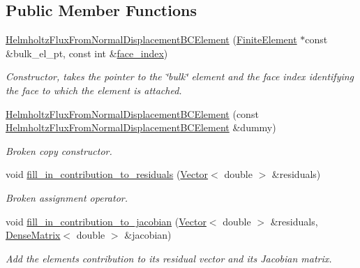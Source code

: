 \subsection*{Public Member Functions}
\begin{DoxyCompactItemize}
\item 
\hyperlink{classoomph_1_1HelmholtzFluxFromNormalDisplacementBCElement_ae37a7a8b5ad9850527f9285f2325aa2c}{Helmholtz\+Flux\+From\+Normal\+Displacement\+B\+C\+Element} (\hyperlink{classoomph_1_1FiniteElement}{Finite\+Element} $\ast$const \&bulk\+\_\+el\+\_\+pt, const int \&\hyperlink{classoomph_1_1FaceElement_a478d577ac6db67ecc80f1f02ae3ab170}{face\+\_\+index})
\begin{DoxyCompactList}\small\item\em Constructor, takes the pointer to the \char`\"{}bulk\char`\"{} element and the face index identifying the face to which the element is attached. \end{DoxyCompactList}\item 
\hyperlink{classoomph_1_1HelmholtzFluxFromNormalDisplacementBCElement_a5c093c485f9df81a14729f2ef41eced1}{Helmholtz\+Flux\+From\+Normal\+Displacement\+B\+C\+Element} (const \hyperlink{classoomph_1_1HelmholtzFluxFromNormalDisplacementBCElement}{Helmholtz\+Flux\+From\+Normal\+Displacement\+B\+C\+Element} \&dummy)
\begin{DoxyCompactList}\small\item\em Broken copy constructor. \end{DoxyCompactList}\item 
void \hyperlink{classoomph_1_1HelmholtzFluxFromNormalDisplacementBCElement_aab5bbb5d7c84d2aa0a5d9112e6f2d914}{fill\+\_\+in\+\_\+contribution\+\_\+to\+\_\+residuals} (\hyperlink{classoomph_1_1Vector}{Vector}$<$ double $>$ \&residuals)
\begin{DoxyCompactList}\small\item\em Broken assignment operator. \end{DoxyCompactList}\item 
void \hyperlink{classoomph_1_1HelmholtzFluxFromNormalDisplacementBCElement_a5e10f6e632c05ce464548f51c8381b43}{fill\+\_\+in\+\_\+contribution\+\_\+to\+\_\+jacobian} (\hyperlink{classoomph_1_1Vector}{Vector}$<$ double $>$ \&residuals, \hyperlink{classoomph_1_1DenseMatrix}{Dense\+Matrix}$<$ double $>$ \&jacobian)
\begin{DoxyCompactList}\small\item\em Add the element\textquotesingle{}s contribution to its residual vector and its Jacobian matrix. \end{DoxyCompactList}\item 

\end{DoxyCompactItemize}
